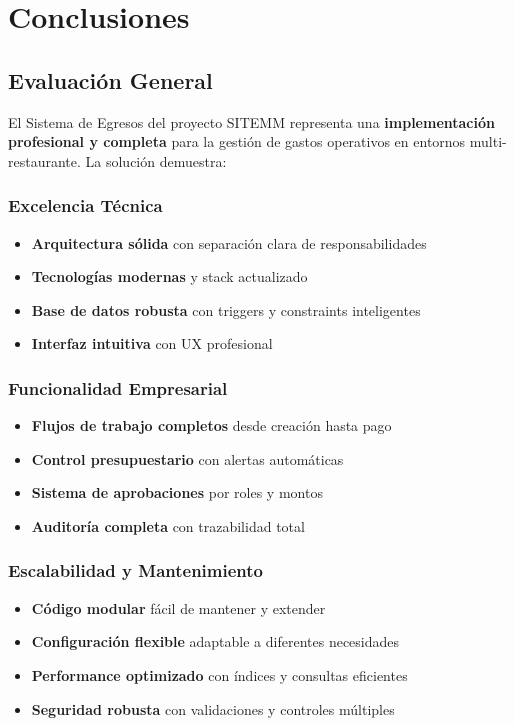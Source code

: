 \documentclass[12pt,a4paper]{article}
\newcommand{\highlight}[1]{\textcolor{primaryblue}{\textbf{#1}}}
\newcommand{\success}[1]{\textcolor{secondarygreen}{\textbf{#1}}}
\begin{document}

\section{Conclusiones}

\subsection{Evaluación General}

El Sistema de Egresos del proyecto SITEMM representa una \highlight{implementación profesional y completa} para la gestión de gastos operativos en entornos multi-restaurante. La solución demuestra:

\subsubsection{Excelencia Técnica}
\begin{itemize}[leftmargin=*]
    \item \success{Arquitectura sólida} con separación clara de responsabilidades
    \item \success{Tecnologías modernas} y stack actualizado
    \item \success{Base de datos robusta} con triggers y constraints inteligentes
    \item \success{Interfaz intuitiva} con UX profesional
\end{itemize}

\subsubsection{Funcionalidad Empresarial}
\begin{itemize}[leftmargin=*]
    \item \success{Flujos de trabajo completos} desde creación hasta pago
    \item \success{Control presupuestario} con alertas automáticas
    \item \success{Sistema de aprobaciones} por roles y montos
    \item \success{Auditoría completa} con trazabilidad total
\end{itemize}

\subsubsection{Escalabilidad y Mantenimiento}
\begin{itemize}[leftmargin=*]
    \item \success{Código modular} fácil de mantener y extender
    \item \success{Configuración flexible} adaptable a diferentes necesidades
    \item \success{Performance optimizado} con índices y consultas eficientes
    \item \success{Seguridad robusta} con validaciones y controles múltiples
\end{itemize}
\end{document}
